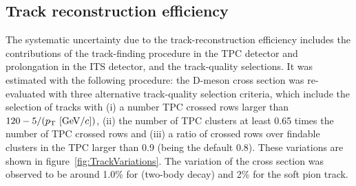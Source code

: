 

\clearpage
\subsection{Track reconstruction efficiency}

The systematic uncertainty due to the track-reconstruction efficiency includes the contributions of the track-finding procedure in the TPC detector and prolongation in the ITS detector, and the track-quality selections. It was estimated with the following procedure: the D-meson cross section was re-evaluated with three alternative track-quality selection criteria, which include the selection of tracks with (i) a number TPC crossed rows larger than $120-5/(p_{\rm T}~[{\rm GeV}/c])$, (ii) the number of TPC clusters at least 0.65 times the number of TPC crossed rows and (iii) a ratio of crossed rows over findable clusters in the TPC larger than 0.9 (being the default 0.8). These variations are shown in figure~\ref{fig:TrackVariations}.
The variation of the cross section was observed to be around 1.0\% for \Dzero (two-body decay) and 2\% for the soft pion track. 

